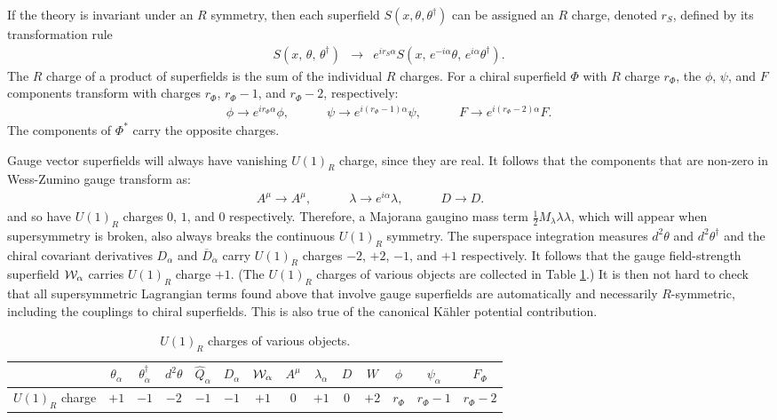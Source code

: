 \documentclass[12pt]{article}
\def\beq{\begin{eqnarray}}
\def\eeq{\end{eqnarray}}
\def\Dcon{\overline D}
\begin{document}
If the theory is invariant under an $R$ symmetry, then each superfield $S(x,\theta,\theta^\dagger)$ can be assigned an $R$ charge, denoted $r_S$, defined by its transformation rule
\beq
S(x,\,\theta,\,\theta^\dagger) &\rightarrow& 
e^{i r_S \alpha} S(x,\, e^{-i \alpha} \theta,\, e^{i\alpha}\theta^\dagger).
\eeq
The $R$ charge of a product of superfields is the sum of the individual $R$ charges.
For a chiral superfield $\Phi$ with $R$ charge $r_\Phi$, the $\phi$, $\psi$, and $F$ 
components transform with charges $r_\Phi$, $r_\Phi -1$, and $r_\Phi-2$, respectively:
\beq
\phi \rightarrow e^{ir_\Phi\alpha} \phi,\qquad\quad
\psi \rightarrow e^{i(r_\Phi - 1)\alpha} \psi,\qquad\quad
F \rightarrow e^{i(r_\Phi - 2)\alpha} F.
\eeq
The components of $\Phi^*$ carry the opposite charges.

Gauge vector superfields will always have vanishing $U(1)_R$ charge, since they are 
real. It follows that the components that are non-zero in Wess-Zumino 
gauge transform as:
\beq
A^\mu \rightarrow A^\mu,\qquad\quad
\lambda \rightarrow e^{i\alpha} \lambda,\qquad\quad
D \rightarrow D.\qquad\quad
\label{eq:Rchargesvector}
\eeq
and so have $U(1)_R$ charges $0$, $1$, and $0$ respectively.
Therefore, a Majorana gaugino mass term $\frac{1}{2} M_\lambda \lambda\lambda$, 
which will appear when supersymmetry is broken, also always breaks the 
continuous $U(1)_R$ symmetry.
The superspace integration measures $d^2\theta$ and $d^2\theta^\dagger$ 
and the chiral covariant derivatives $D_\alpha$ and 
$\Dcon_{\dot\alpha}$ carry $U(1)_R$ charges $-2$, $+2$, $-1$, and $+1$ 
respectively. It follows that the gauge field-strength superfield 
${\cal W}_\alpha$ carries $U(1)_R$ charge $+1$. (The $U(1)_R$ charges of various
objects are collected in Table \ref{table:Rcharges}.) 
It is then not hard to check that all 
supersymmetric Lagrangian terms found above that involve gauge superfields are 
automatically and necessarily $R$-symmetric, including the couplings to 
chiral superfields. This is also true of the canonical K\"ahler potential
contribution.%
\renewcommand{\arraystretch}{1.4}
\begin{table}[tb]
\begin{center}
%
\begin{tabular}{|c|c|c|c|c|c|c|c|c|c|c|c|c|c|}
\hline
& $\theta_\alpha$ 
& $\theta^\dagger_{\dot\alpha}$
& $d^2\theta$
& $\hat Q_\alpha$ 
& $D_\alpha$ 
& ${\cal W}_\alpha$
& $A^\mu$ 
& $\lambda_\alpha$ 
& $D$ 
& $W$
& $\phi$ 
& $\psi_\alpha$
& $F_\Phi$
\\ \hline 
$U(1)_R$ charge 
& $+1$ 
& $-1$ 
& $-2$ 
& $-1$ 
& $-1$ 
& $+1$ 
& $0$ 
& $+1$ 
& $0$ 
& $+2$ 
& $r_\Phi$ 
& $r_\Phi-1$ 
& $r_\Phi-2$
\\ \hline
\end{tabular}
%
\caption{$U(1)_R$ charges of various objects.\label{table:Rcharges}} 
\end{center}
\end{table}
\end{document}
